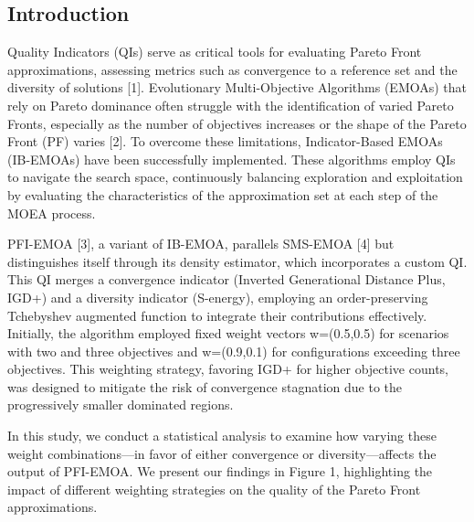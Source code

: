 \documentclass[a0,portrait]{a0poster}
\begin{document}
\begin{mdframed}[style=MyFrame]
\begin{multicols}{2}
\section{Introduction}\label{section:1}

Quality Indicators (QIs) serve as critical tools for evaluating Pareto Front approximations, assessing metrics such as convergence to a reference set and the diversity of solutions [1]. Evolutionary Multi-Objective Algorithms (EMOAs) that rely on Pareto dominance often struggle with the identification of varied Pareto Fronts, especially as the number of objectives increases or the shape of the Pareto Front (PF) varies [2]. To overcome these limitations, Indicator-Based EMOAs (IB-EMOAs) have been successfully implemented. These algorithms employ QIs to navigate the search space, continuously balancing exploration and exploitation by evaluating the characteristics of the approximation set at each step of the MOEA process.

PFI-EMOA [3], a variant of IB-EMOA, parallels SMS-EMOA [4] but distinguishes itself through its density estimator, which incorporates a custom QI. This QI merges a convergence indicator (Inverted Generational Distance Plus, IGD+) and a diversity indicator (S-energy), employing an order-preserving Tchebyshev augmented function to integrate their contributions effectively. Initially, the algorithm employed fixed weight vectors w=(0.5,0.5) for scenarios with two and three objectives and w=(0.9,0.1) for configurations exceeding three objectives. This weighting strategy, favoring IGD+ for higher objective counts, was designed to mitigate the risk of convergence stagnation due to the progressively smaller dominated regions.

In this study, we conduct a statistical analysis to examine how varying these weight combinations—in favor of either convergence or diversity—affects the output of PFI-EMOA. We present our findings in Figure 1, highlighting the impact of different weighting strategies on the quality of the Pareto Front approximations.





\end{multicols}
\end{mdframed}
\end{document}
